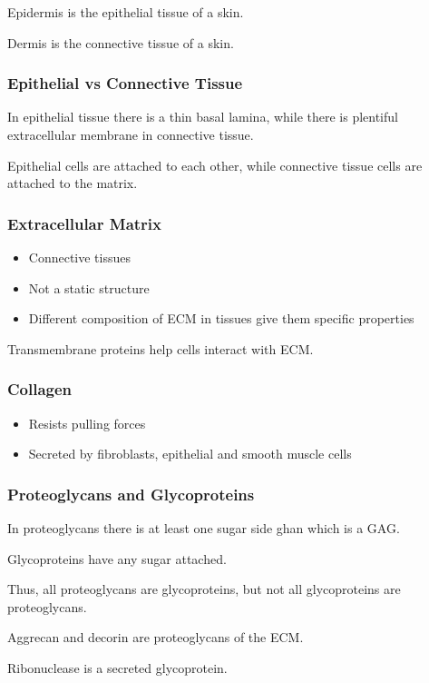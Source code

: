 \documentclass[11pt]{scrartcl}
\begin{document}
Epidermis is the epithelial tissue of a skin. %

Dermis is the connective tissue of a skin.

\subsubsection{Epithelial vs Connective Tissue}

In epithelial tissue there is a thin basal lamina, while there is
plentiful extracellular membrane in connective tissue.

Epithelial cells are attached to each other, while connective tissue
cells are attached to the matrix.

\subsubsection{Extracellular Matrix}

\begin{itemize}
\item Connective tissues 
\item Not a static structure
\item Different composition of ECM in tissues give them specific properties
\end{itemize}

Transmembrane proteins help cells interact with ECM.

\subsubsection{Collagen}

\begin{itemize}
\item Resists pulling forces
\item Secreted by fibroblasts, epithelial and smooth muscle cells
\end{itemize}

\subsubsection{Proteoglycans and Glycoproteins}

In proteoglycans there is at least one sugar side ghan which is  a GAG. 

Glycoproteins have any sugar attached.

Thus, all proteoglycans are glycoproteins, but not all glycoproteins are proteoglycans.
\begin{example}

Aggrecan and decorin are proteoglycans of the ECM.

Ribonuclease is a secreted glycoprotein.

\end{example}
\end{document}
